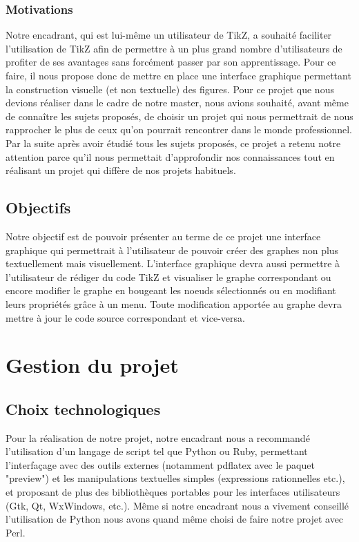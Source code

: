\documentclass[a4paper]{report}
\begin{document}
  \subsection{Motivations}
  Notre encadrant, qui est lui-même un utilisateur de TikZ, a souhaité faciliter l'utilisation de TikZ afin de permettre à un plus grand nombre d'utilisateurs de profiter de ses avantages sans forcément passer par son apprentissage. Pour ce faire, il nous propose donc de mettre en place une interface graphique permettant la construction  visuelle (et non textuelle) des figures.
  \newline
  Pour ce projet que nous devions réaliser dans le cadre de notre master, nous avions souhaité, avant même de 
connaître les sujets proposés, de choisir un projet qui nous permettrait de nous rapprocher le plus de ceux qu'on pourrait rencontrer dans le monde professionnel. Par la suite après avoir étudié tous les sujets proposés, ce projet a retenu notre attention parce qu'il nous permettait d'approfondir nos connaissances tout en réalisant un projet qui diffère de nos projets habituels.
  \section{Objectifs}
  Notre objectif est de pouvoir présenter au terme de ce projet une interface graphique qui permettrait à l'utilisateur de pouvoir créer des graphes non plus textuellement mais visuellement. L'interface graphique devra aussi permettre à l'utilisateur de rédiger du code TikZ et visualiser le graphe correspondant ou encore modifier le graphe en bougeant les noeuds sélectionnés ou en modifiant leurs propriétés grâce à un menu.
Toute modification apportée au graphe devra mettre à jour le code source correspondant et vice-versa. 
  \chapter {Gestion du projet}

  \section{Choix technologiques}
  Pour la réalisation de notre projet, notre encadrant nous a recommandé l'utilisation d'un langage de script tel que Python ou Ruby, permettant l'interfaçage avec des outils externes (notamment pdflatex avec le paquet "preview") et les manipulations textuelles simples (expressions rationnelles etc.), et proposant de plus des bibliothèques portables pour les interfaces utilisateurs (Gtk, Qt, WxWindows, etc.). Même si notre encadrant nous a vivement conseillé l'utilisation de Python nous avons quand même choisi de faire notre projet avec Perl. 
\end{document}
